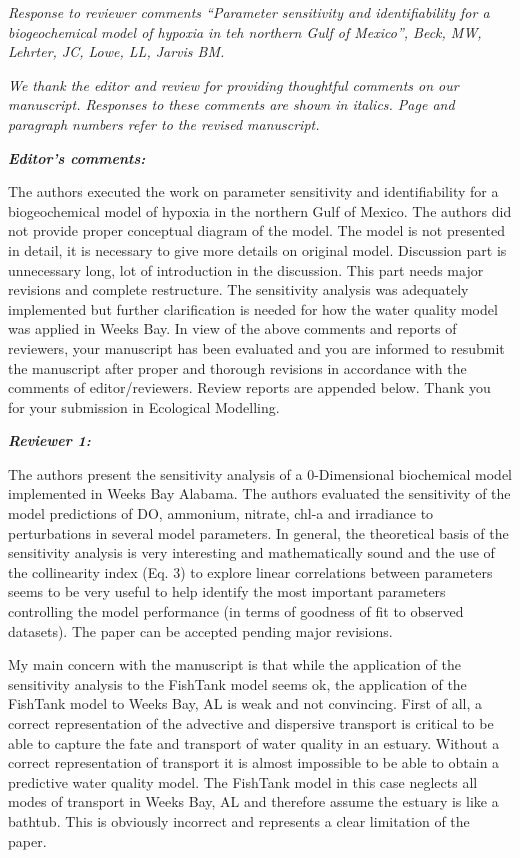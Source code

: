 \documentclass[letterpaper,12pt]{article}\usepackage[]{graphicx}\usepackage[]{color}
\newcommand{\Bigtxt}[1]{\textbf{\textit{#1}}}
\begin{document}
\raggedright


{\it Response to reviewer comments ``Parameter sensitivity and identifiability for a biogeochemical model of hypoxia in teh northern Gulf of Mexico'', Beck, MW, Lehrter, JC, Lowe, LL, Jarvis BM.}

{\it We thank the editor and review for providing thoughtful comments on our manuscript.  Responses to these comments are shown in italics.  Page and paragraph numbers refer to the revised manuscript.}

\Bigtxt{Editor's comments:}

The authors executed the work on parameter sensitivity and identifiability for a biogeochemical model of hypoxia in the northern Gulf of Mexico. The authors did not provide proper conceptual diagram of the model.  The model is not presented in detail, it is necessary to give more details on original model. Discussion part is unnecessary long, lot of introduction in the discussion. This part needs major revisions and complete restructure. The sensitivity analysis was adequately implemented but further clarification is needed for how the water quality model was applied in Weeks Bay. In view of the above comments and reports of reviewers, your manuscript has been evaluated and you are informed to resubmit the manuscript after proper and thorough revisions in accordance with the comments of editor/reviewers. Review reports are appended below. Thank you for your submission in Ecological Modelling. 

\Bigtxt{Reviewer 1:}

The authors present the sensitivity analysis of a 0-Dimensional biochemical model implemented in Weeks Bay Alabama. The authors evaluated the sensitivity of the model predictions of DO, ammonium, nitrate, chl-a and irradiance to perturbations in several model parameters. In general, the theoretical basis of the sensitivity analysis is very interesting and mathematically sound and the use of the collinearity index (Eq. 3) to explore linear correlations between parameters seems to be very useful to help identify the most important parameters controlling the model performance (in terms of goodness of fit to observed datasets). The paper can be accepted pending major revisions. 

My main concern with the manuscript is that while the application of the sensitivity analysis to the FishTank model seems ok, the application of the FishTank model to Weeks Bay, AL is weak and not convincing. First of all, a correct representation of the advective and dispersive transport is critical to be able to capture the fate and transport of water quality in an estuary. Without a correct representation of transport it is almost impossible to be able to obtain a predictive water quality model. The FishTank model in this case neglects all modes of transport in Weeks Bay, AL and therefore assume the estuary is like a bathtub. This is obviously incorrect and represents a clear limitation of the paper.
\end{document}

